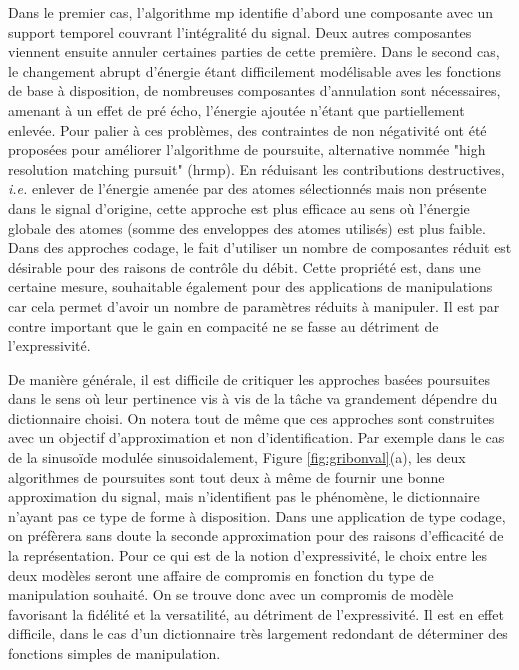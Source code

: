 Dans le premier cas, l'algorithme mp identifie d'abord une composante avec un support temporel couvrant l'intégralité du signal. Deux autres composantes viennent ensuite annuler certaines parties de cette première. Dans le second cas, le changement abrupt d'énergie étant difficilement modélisable aves les fonctions de base à disposition, de nombreuses composantes d'annulation sont nécessaires, amenant à un effet de pré écho, l'énergie ajoutée n'étant que partiellement enlevée. Pour palier à ces problèmes, des contraintes de non négativité ont été proposées pour améliorer l'algorithme de poursuite, alternative nommée "high resolution matching pursuit" (hrmp). En réduisant les contributions destructives, \textit{i.e.} enlever de l'énergie amenée par des atomes sélectionnés mais non présente dans le signal d'origine, cette approche est plus efficace au sens où l'énergie globale des atomes (somme des enveloppes des atomes utilisés) est plus faible. Dans des approches codage, le fait d'utiliser un nombre de composantes réduit est désirable pour des raisons de contrôle du débit. Cette propriété est, dans une certaine mesure, souhaitable également pour des applications de manipulations car cela permet d'avoir un nombre de paramètres réduits à manipuler. Il est par contre important que le gain en compacité ne se fasse au détriment de l'expressivité.

De manière générale, il est difficile de critiquer les approches basées poursuites dans le sens où leur pertinence vis à vis de la tâche va grandement dépendre du dictionnaire choisi. On notera tout de même que ces approches sont construites avec un objectif d'approximation et non d'identification. Par exemple dans le cas de la sinusoïde modulée sinusoidalement, Figure \ref{fig:gribonval}(a), les deux algorithmes de poursuites sont tout deux à même de fournir une bonne approximation du signal, mais \og n'identifient \fg pas le phénomène, le dictionnaire n'ayant pas ce type de forme à disposition. Dans une application de type codage, on préfèrera sans doute la seconde approximation pour des raisons d'efficacité de la représentation. Pour ce qui est de la notion d'expressivité, le choix entre les deux modèles seront une affaire de compromis en fonction du type de manipulation souhaité. On se trouve donc avec un compromis de modèle favorisant la fidélité et la versatilité, au détriment de l'expressivité. Il est en effet difficile, dans le cas d'un dictionnaire très largement redondant de déterminer des fonctions simples de manipulation.


